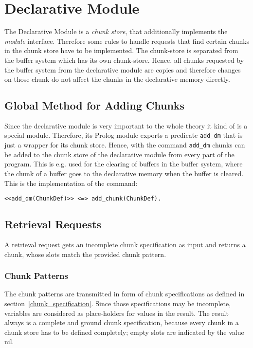 \section{Declarative Module}

The Declarative Module is a \emph{chunk store}, that additionally implements the \emph{module} interface. Therefore some rules to handle requests that find certain chunks in the chunk store have to be implemented. The chunk-store is separated from the buffer system which has its own chunk-store. Hence, all chunks requested by the buffer system from the declarative module are copies and therefore changes on those chunk do not affect the chunks in the declarative memory directly.

\subsection{Global Method for Adding Chunks}
\label{global_method_for_adding_chunks}

Since the declarative module is very important to the whole theory it kind of is a special module. Therefore, its Prolog module exports a predicate \lstinline|add_dm| that is just a wrapper for its chunk store. Hence, with the command \lstinline|add_dm| chunks can be added to the chunk store of the declarative module from every part of the program. This is e.g. used for the clearing of buffers in the buffer system, where the chunk of a buffer goes to the declarative memory when the buffer is cleared. This is the implementation of the command:

\begin{lstlisting}
<<add_dm(ChunkDef)>> <=> add_chunk(ChunkDef).
\end{lstlisting}

\subsection{Retrieval Requests}
\label{retrieval_requests}

A retrieval request gets an incomplete chunk specification as input and returns a chunk, whose slots match the provided chunk pattern.

\subsubsection{Chunk Patterns}

The chunk patterns are transmitted in form of chunk specifications as defined in section~\ref{chunk_specification}. Since those specifications may be incomplete, variables are considered as place-holders for values in the result. The result always is a complete and ground chunk specification, because every chunk in a chunk store has to be defined completely; empty slots are indicated by the value nil.

